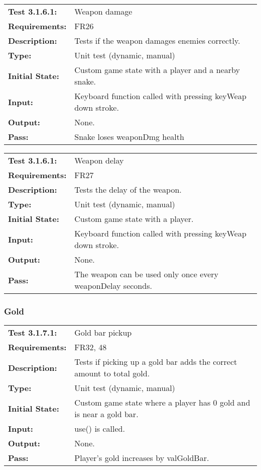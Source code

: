 \documentclass[12pt, titlepage]{article}
\begin{document}
\begin{tabular}{|l|p{10cm}|}
    \hline
    \bf{Test} 3.1.6.1: & Weapon damage \\
    \bf{Requirements}: & FR26 \\
    \bf{Description}: & Tests if the weapon damages enemies correctly. \\
    \bf{Type}: & Unit test (dynamic, manual) \\
    \bf{Initial State}: & Custom game state with a player and a nearby snake. \\
    \bf{Input}: & Keyboard function called with pressing keyWeap down stroke. \\
    \bf{Output}: & None. \\
    \bf{Pass}: & Snake loses weaponDmg health \\
    \hline
\end{tabular}

\begin{tabular}{|l|p{10cm}|}
    \hline
    \bf{Test} 3.1.6.1: & Weapon delay \\
    \bf{Requirements}: & FR27 \\
    \bf{Description}: & Tests the delay of the weapon. \\
    \bf{Type}: & Unit test (dynamic, manual) \\
    \bf{Initial State}: & Custom game state with a player. \\
    \bf{Input}: & Keyboard function called with pressing keyWeap down stroke. \\
    \bf{Output}: & None. \\
    \bf{Pass}: & The weapon can be used only once every weaponDelay seconds. \\
    \hline
\end{tabular}

\subsubsection{Gold}

\begin{tabular}{|l|p{10cm}|}
    \hline
    \bf{Test} 3.1.7.1: & Gold bar pickup \\
    \bf{Requirements}: & FR32, 48 \\
    \bf{Description}: & Tests if picking up a gold bar adds the correct amount to total gold. \\
    \bf{Type}: & Unit test (dynamic, manual) \\
    \bf{Initial State}: & Custom game state where a player has $0$ gold and is near a gold bar. \\
    \bf{Input}: & use() is called. \\
    \bf{Output}: & None. \\
    \bf{Pass}: & Player's gold increases by valGoldBar. \\
    \hline
\end{tabular}
\end{document}
